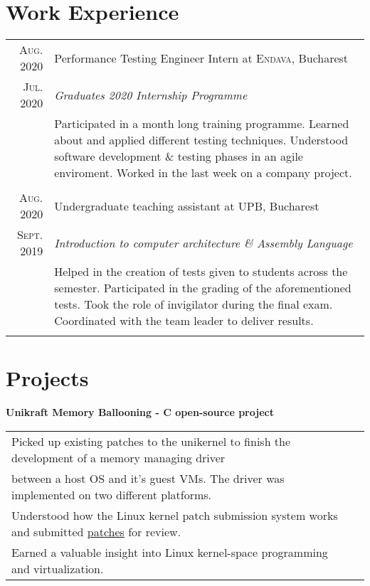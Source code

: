 \documentclass[a4paper,10pt]{article}
\begin{document}
\section{Work Experience}
	\begin{tabular}{r|p{11cm}}
	
		 \textsc{Aug. 2020} & Performance Testing Engineer Intern at \textsc{Endava}, Bucharest \\
		\textsc{Jul. 2020}&\emph{Graduates 2020 Internship Programme}\\&
		\footnotesize{Participated in a month long training programme. Learned about and applied different testing techniques.
			Understood software development \& testing phases in an agile enviroment. Worked in the last week on a company project.}
		\\\multicolumn{2}{c}{} \\
		
		\textsc{Aug. 2020} & Undergraduate teaching assistant at \textsc{UPB}, Bucharest \\
		\textsc{Sept. 2019}&\emph{Introduction to computer architecture \& Assembly Language}\\&
		\footnotesize{Helped in the creation of tests given to students across the semester. Participated in the grading of the aforementioned tests.
			Took the role of invigilator during the final exam. Coordinated with the team leader to deliver results.}
		\\\multicolumn{2}{c}{} \\
	
	\end{tabular}

\section{Projects}
	\begin{flushleft}
		\textbf{Unikraft Memory Ballooning - C open-source project}
	\end{flushleft}
	\begin{tabular}{ll}
		\textbullet\enspace\enspace Picked up existing patches to the unikernel to finish the development of a memory managing driver
				\\\enspace\enspace\enspace between a host OS and it's guest VMs. The driver was implemented on two different platforms.\\
		\textbullet\enspace\enspace Understood how the Linux kernel patch submission system works and submitted
										\href{https://patchwork.unikraft.org/project/unikraft/list/?series=1532}{patches} for review.\\
		\textbullet\enspace\enspace Earned a valuable insight into Linux kernel-space programming and virtualization.\\
	\end{tabular}
\end{document}
